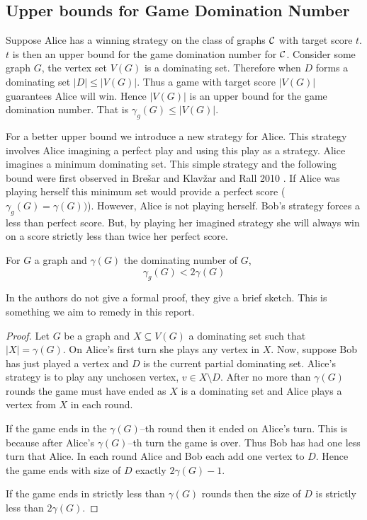 \subsection{Upper bounds for Game Domination Number}
Suppose Alice has a winning strategy on the class of graphs $\mathcal{C}$ with target score $t$. $t$ is then an upper bound for the game domination number for $\mathcal{C}$. Consider some graph $G$, the vertex set $V(G)$ is a dominating set. Therefore when $D$ forms a dominating set $|D|\leq |V(G)|$. Thus a game with target score $|V(G)|$ guarantees Alice will win. Hence $|V(G)|$ is an upper bound for the game domination number. That is $\gamma_g(G) \leq |V(G)|$. 

For a better upper bound we introduce a new strategy for Alice. This strategy involves Alice imagining a perfect play and using this play as a strategy. Alice imagines a minimum dominating set. This simple strategy and the following bound were first observed in Bre\v{s}ar and Klav\v{z}ar and Rall 2010 \cite{BrKlRa2010}. If Alice was playing herself this minimum set would provide a perfect score ($\gamma_g(G)=\gamma(G))$). However, Alice is not playing herself. Bob's strategy forces a less than perfect score. But, by playing her imagined strategy she will always win on a score strictly less than twice her perfect score.

\begin{theorem}\label{thm:gamedomup}
    For $G$ a graph and $\gamma(G)$ the dominating number of $G$,  
    \[\gamma_g(G)<2\gamma(G)\]
\end{theorem}
In \cite{BrKlRa2010} the authors do not give a formal proof, they give a brief sketch. This is something we aim to remedy in this report. 
\begin{proof}
    Let $G$ be a graph and $X\subseteq V(G)$ a dominating set such that $|X| = \gamma(G)$. On Alice's first turn she plays any vertex in $X$. Now, suppose Bob has just played a vertex and $D$ is the current partial dominating set. Alice's strategy is to play any unchosen vertex, $v\in X\setminus D$. After no more than $\gamma(G)$ rounds the game must have ended as $X$ is a dominating set and Alice plays a vertex from $X$ in each round. 
    
    If the game ends in the $\gamma(G)$--th round then it ended on Alice's turn. This is because after Alice's $\gamma(G)$--th turn the game is over. Thus Bob has had one less turn that Alice. In each round Alice and Bob each add one vertex to $D$. Hence the game ends with size of $D$ exactly $2\gamma(G) -1$. 
    
    If the game ends in strictly less than $\gamma(G)$ rounds then the size of $D$ is strictly less than $2\gamma(G)$.
\end{proof}

